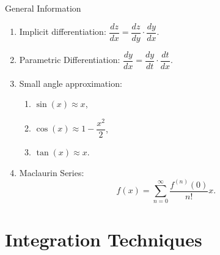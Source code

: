 \documentclass[oneside]{book}
\begin{document}
\begin{stbox}{General Information}
\begin{enumerate}
\begin{center}
\begin{tabular}{|Sc|Sc|}
        \hline
        \(a^x\) & \(a^x \ln(a)\)\\
        \hline
      \end{tabular}
    \end{center}
    \item Implicit differentiation: \(\dfrac{dz}{dx}=\dfrac{dz}{dy}\cdot \dfrac{dy}{dx}\).
    \item Parametric Differentiation: \(\dfrac{dy}{dx}=\dfrac{dy}{dt}\cdot \dfrac{dt}{dx}\).
    \item Small angle approximation: 
    \begin{enumerate}
      \item \(\sin(x) \approx x\),
      \item \(\cos(x) \approx 1-\dfrac{x^2}{2}\),
      \item \(\tan(x) \approx x\).
    \end{enumerate}
    \item Maclaurin Series: 
    \[f(x)=\sum_{n=0}^{\infty}\dfrac{f^{(n)}(0)}{n!}x.\]
  \end{enumerate}
\end{stbox}
\chapter{Integration Techniques}
\end{document}
